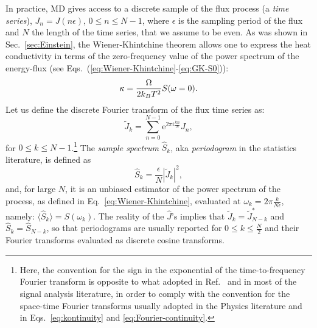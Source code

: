 In practice, MD gives access to a discrete sample of the flux process (a \emph{time series}), $J_n = J(n \epsilon)$, $0 \leq n \leq N-1$, where $\epsilon$ is the sampling period of the flux and $N$ the length of the time series, that we assume to be even. As was shown in Sec.~\ref{sec:Einstein}, the Wiener-Khintchine theorem allows one to express the heat conductivity in terms of the zero-frequency value of the power spectrum of the energy-flux (see Eqs.~(\ref{eq:Wiener-Khintchine}-\ref{eq:GK-S0})):
\begin{equation}
\kappa = \frac{\rOmega}{2k_B T^2} S (\omega=0). \label{eq:kappa-S0}
\end{equation}
Let us define the discrete Fourier transform of the flux time series as:
\begin{equation}
  \tilde{J}_{k}=\sum_{n=0}^{N-1} \mathrm{e}^{ 2\pi i\frac{kn}{N}} J_n, \label{eq:Jk}
\end{equation}
for $0 \leq k \leq N-1$.\footnote{Here, the convention for the sign in the exponential of the time-to-frequency Fourier transform is opposite to what adopted in Ref.~\cite{Ercole2017} and in most of the signal analysis literature, in order to comply with the convention for the space-time Fourier transforms usually adopted in the Physics literature and in Eqs.~\eqref{eq:kontinuity} and \eqref{eq:Fourier-continuity}.} The \emph{sample spectrum} $\hat S_k$, aka \emph{periodogram} in the statistics literature, is defined as
\begin{equation}
\hat{S}_{k}=\frac{\epsilon}{N} \left |\tilde{J}_{k} \right |^2, \label{eq:periodogram-def}
\end{equation}
and, for large $N$, it is an unbiased estimator of the power spectrum of the process, as defined in Eq.~\eqref{eq:Wiener-Khintchine}, evaluated at $\omega_k=2\pi\frac{k}{N\epsilon}$, namely: $\langle \hat S_k \rangle = S(\omega_k)$. The reality of the $\hat J$'s implies that $\tilde J_k=\tilde J^*_{N-k}$ and $\hat S_k=\hat S_{N-k}$, so that periodograms are usually reported for $0\leq k\leq \frac{N}{2}$ and their Fourier transforms evaluated as discrete cosine transforms.

